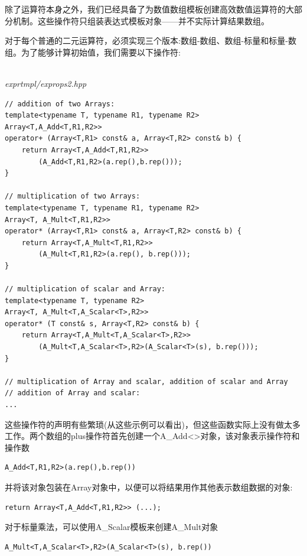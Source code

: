 除了运算符本身之外，我们已经具备了为数值数组模板创建高效数值运算符的大部分机制。这些操作符只组装表达式模板对象——并不实际计算结果数组。

对于每个普通的二元运算符，必须实现三个版本:数组-数组、数组-标量和标量-数组。为了能够计算初始值，我们需要以下操作符:

\hspace*{\fill} \\ %
\noindent
\textit{exprtmpl/exprops2.hpp}
\begin{lstlisting}[style=styleCXX]
// addition of two Arrays:
template<typename T, typename R1, typename R2>
Array<T,A_Add<T,R1,R2>>
operator+ (Array<T,R1> const& a, Array<T,R2> const& b) {
	return Array<T,A_Add<T,R1,R2>>
		(A_Add<T,R1,R2>(a.rep(),b.rep()));
}

// multiplication of two Arrays:
template<typename T, typename R1, typename R2>
Array<T, A_Mult<T,R1,R2>>
operator* (Array<T,R1> const& a, Array<T,R2> const& b) {
	return Array<T,A_Mult<T,R1,R2>>
		(A_Mult<T,R1,R2>(a.rep(), b.rep()));
}

// multiplication of scalar and Array:
template<typename T, typename R2>
Array<T, A_Mult<T,A_Scalar<T>,R2>>
operator* (T const& s, Array<T,R2> const& b) {
	return Array<T,A_Mult<T,A_Scalar<T>,R2>>
		(A_Mult<T,A_Scalar<T>,R2>(A_Scalar<T>(s), b.rep()));
}

// multiplication of Array and scalar, addition of scalar and Array
// addition of Array and scalar:
...
\end{lstlisting}

这些操作符的声明有些繁琐(从这些示例可以看出)，但这些函数实际上没有做太多工作。两个数组的plus操作符首先创建一个A\_Add<>对象，该对象表示操作符和操作数

\begin{lstlisting}[style=styleCXX]
A_Add<T,R1,R2>(a.rep(),b.rep())
\end{lstlisting}

并将该对象包装在Array对象中，以便可以将结果用作其他表示数组数据的对象:

\begin{lstlisting}[style=styleCXX]
return Array<T,A_Add<T,R1,R2>> (...);
\end{lstlisting}

对于标量乘法，可以使用A\_Scalar模板来创建A\_Mult对象

\begin{lstlisting}[style=styleCXX]
A_Mult<T,A_Scalar<T>,R2>(A_Scalar<T>(s), b.rep())
\end{lstlisting}

